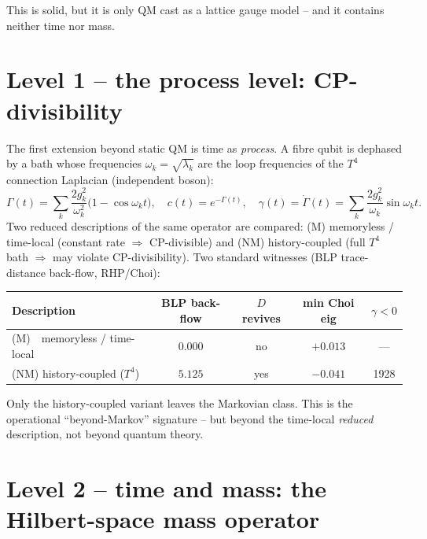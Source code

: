 This is solid, but it is only QM cast as a lattice gauge model -- and it
contains neither time nor mass.

\section{Level 1 -- the process level: CP-divisibility}

The first extension beyond static QM is time as \emph{process}. A fibre qubit
is dephased by a bath whose frequencies $\omega_k=\sqrt{\lambda_k}$ are the
loop frequencies of the $T^4$ connection Laplacian (independent boson):
\begin{equation}
  \Gamma(t)=\sum_k\frac{2g_k^2}{\omega_k^2}\bigl(1-\cos\omega_k t\bigr),\quad
  c(t)=e^{-\Gamma(t)},\quad
  \gamma(t)=\dot\Gamma(t)=\sum_k\frac{2g_k^2}{\omega_k}\sin\omega_k t.
\end{equation}
Two reduced descriptions of the same operator are compared: (M) memoryless /
time-local (constant rate $\Rightarrow$ CP-divisible) and (NM) history-coupled
(full $T^4$ bath $\Rightarrow$ may violate CP-divisibility). Two standard
witnesses (BLP trace-distance back-flow, RHP/Choi):

\begin{center}
\begin{tabular}{lcccc}
\toprule
Description & BLP back-flow & $D$ revives & min Choi eig & $\gamma<0$ \\
\midrule
(M)\ \ memoryless / time-local      & $0.000$ & no  & $+0.013$ & --- \\
(NM) history-coupled ($T^4$)        & $5.125$ & yes & $-0.041$ & 1928 \\
\bottomrule
\end{tabular}
\end{center}

Only the history-coupled variant leaves the Markovian class. This is the
operational \enquote{beyond-Markov} signature -- but beyond the time-local
\emph{reduced} description, not beyond quantum theory.

\section{Level 2 -- time and mass: the Hilbert-space mass operator}

